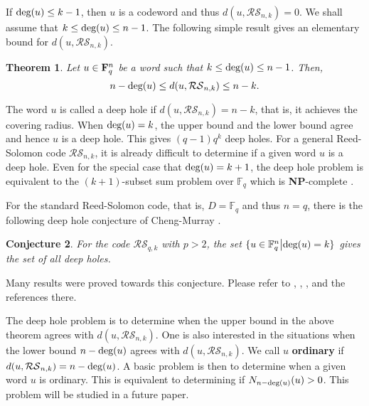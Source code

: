 \documentclass[reqno]{amsart}
\newtheorem{thm}{Theorem}[section]
\newtheorem{conj}[thm]{Conjecture}
\theoremstyle{remark}
\numberwithin{equation}{section}
\newcommand{\de}{\textup{deg}}
\newcommand{\f}{\mathbb{F}_q}
\begin{document}
If $\de(u)\leq k-1$,  then $u$ is a codeword and thus
$d(u, \mathcal{RS}_{n,k})=0$. We shall assume that $k \leq \de(u)\leq n-1$. The
following simple result gives an elementary bound for $d(u,
\mathcal{RS}_{n,k})$.

\begin{thm}\cite{LW1} Let $u\in {\bf F}_q^n$ be a word such that $k \leq \de(u)\leq n-1$.
Then,
$$n-\de(u) \leq d(u, \mathcal{RS}_{n,k}) \leq n-k.$$
\end{thm}


The word $u$ is called a deep hole if $d(u, \mathcal{RS}_{n,k})=n-k$, that is, it
achieves the covering radius. When $\de(u)=k$, the upper bound and the lower bound agree and hence $u$ is a deep hole. This
gives $(q-1)q^k$ deep holes. For a general Reed-Solomon code
$\mathcal{RS}_{n,k}$, it is already difficult to determine if a given word $u$ is a deep hole. Even for the special case that $\de(u)=k+1$, the deep hole problem is equivalent to the $(k+1)$-subset sum problem over $\f$
which is {\bf NP}-complete \cite{CM}.

For the standard Reed-Solomon code, that is, $D=\f$ and
thus $n=q$, there is the following deep hole conjecture of
Cheng-Murray \cite{CM}.
 \begin{conj}
For the code $\mathcal{RS}_{q, k}$ with $p>2$,  the set $\{u\in \f^n \big| \de(u)=k\}$
gives the set of all deep holes.
\end{conj}
 Many results were proved towards this conjecture. Please refer to \cite{CMP12}, \cite{Kai}, \cite{Liao}, \cite{ZCL} and the references there.


The deep hole problem is to determine when the upper bound in the
above theorem agrees with $d(u, \mathcal{RS}_{n,k})$. One is also interested in the situations
when the lower bound $n-\de(u)$ agrees with $d(u, \mathcal{RS}_{n,k})$. %
We call
$u$ {\bf ordinary} if $d(u, \mathcal{RS}_{n,k})=n-\de(u)$. A basic problem is
then to determine when a given word $u$ is ordinary. This is equivalent to determining if $N_{n-\de(u)}(u)>0$.
This problem will be studied in a future paper.
%
\end{document}
